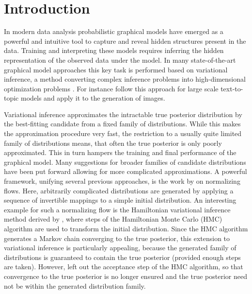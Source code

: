 \section{Introduction}

In modern data analysis probabilistic graphical models have emerged as a powerful and intuitive tool to capture and reveal hidden structures present in the data. Training and interpreting these models requires inferring the hidden representation of the observed data under the model. In many state-of-the-art graphical model approaches this key task is performed based on variational inference, a method converting complex inference problems into high-dimensional optimization problems \parencite{Jordan1999}. For instance \textcite{Hoffman2013} follow this approach for large scale text-to-topic models and \textcite{Gregor2015, Rezende2014, Kingma2014} apply it to the generation of images. 

Variational inference approximates the intractable true posterior distribution by the best-fitting candidate from a fixed family of distributions. While this makes the approximation procedure very fast, the restriction to a usually quite limited family of distributions means, that often the true posterior is only poorly approximated. This in turn hampers the training and final performance of the graphical model. Many suggestions for broader families of candidate distributions have been put forward allowing for more complicated approximations. A powerful framework, unifying several previous approaches, is the work by \textcite{Rezende2015} on normalizing flows. Here, arbitrarily complicated distributions are generated by applying a sequence of invertible mappings to a simple initial distribution. An interesting example for such a normalizing flow is the Hamiltonian variational inference method derived by \textcite{Salimans2014}, where steps of the Hamiltonian Monte Carlo (HMC) algorithm are used to transform the initial distribution. Since the HMC algorithm generates a Markov chain converging to the true posterior, this extension to variational inference is particularly appealing, because the generated family of distributions is guaranteed to contain the true posterior (provided enough steps are taken). However, \textcite{Salimans2014} left out the acceptance step of the HMC algorithm, so that convergence to the true posterior is no longer ensured and the true posterior need not be within the generated distribution family.

